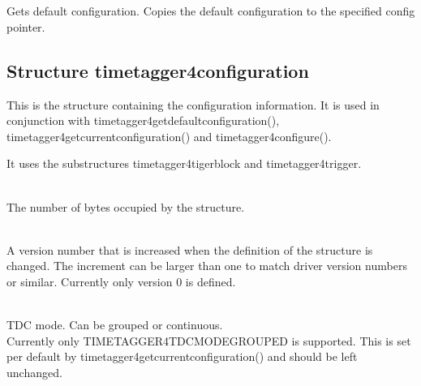		 \\ \\
		Gets default configuration. Copies the default configuration to the specified config pointer.\par

		\subsection{Structure timetagger4\tu configuration}

			This is the structure containing the configuration information. It is used in conjunction with \textsf{timetagger4\tu get\tu default\tu configuration()}, \textsf{timetagger4\tu get\tu current\tu configuration()} and \textsf{timetagger4\tu configure()}.\par

			It uses the substructures \textsf{timetagger4\tu tiger\tu block} and \textsf{timetagger4\tu trigger}.\par

			\\
			The number of bytes occupied by the structure.\par

			\\
			A version number that is increased when the definition of the structure is changed. The increment can be larger than one to match driver version numbers or similar. Currently only version 0 is defined.\par

			\\
			TDC mode. Can be grouped or continuous. \\
			Currently only TIMETAGGER4\tu TDC\tu MODE\tu GROUPED is supported. 
			This is set per default by timetagger4\tu get\tu current\tu configuration() and should be left unchanged.\par

			\par

